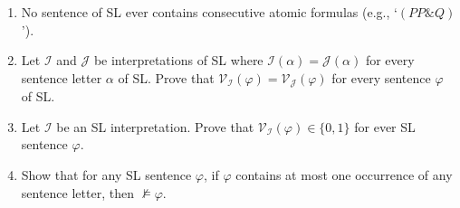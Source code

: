 \documentclass[12pt]{article}
\newcommand{\set}[1]{\lbrace#1\rbrace} %
\newcommand{\I}{\mathcal{I}} %
\newcommand{\J}{\mathcal{J}} %
\newcommand{\V}[1]{\mathcal{V}_{#1}} %
\begin{document}
\begin{enumerate}
  \item No sentence of SL ever contains consecutive atomic formulas (e.g., `$(PP\&Q)$').\\

  \item Let $\I$ and $\J$ be interpretations of SL where $\I(\alpha)=\J(\alpha)$ for every sentence letter $\alpha$ of SL.
    Prove that $\V{\I}(\varphi)=\V{\J}(\varphi)$ for every sentence $\varphi$ of SL.\\

  \item Let $\I$ be an SL interpretation.
    Prove that $\V{\I}(\varphi)\in\set{0,1}$ for ever SL sentence $\varphi$.

  \item Show that for any SL sentence $\varphi$, if $\varphi$ contains at most one occurrence of any sentence letter, then $\nvDash \varphi$. 

\end{enumerate}
\end{document}
